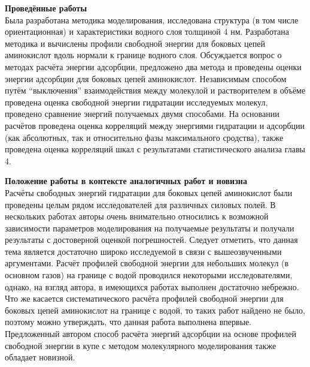 \textbf{Проведённые работы}\\
Была разработана методика моделирования, исследована структура (в том числе ориентационная) и характеристики водного слоя толщиной 4 нм. Разработана методика и вычислены профили свободной энергии для боковых цепей аминокислот вдоль нормали к границе водного слоя. Обсуждается вопрос о методах расчёта энергии адсорбции, предложено два метода и проведены оценки энергии адсорбции для боковых цепей аминокислот. Независимым способом путём ``выключения'' взаимодействия между молекулой и растворителем в объёме проведена оценка свободной энергии гидратации исследуемых молекул, проведено сравнение энергий получаемых двумя способами. На основании расчётов проведена оценка корреляций между энергиями гидратации и адсорбции (как абсолютных, так и относительно фазы максимального сродства), также проведена оценка корреляций шкал с результатами статистического анализа главы 4. 

\textbf{Положение работы в контексте аналогичных работ и новизна}\\
Расчёты свободных энергий гидратации для боковых цепей аминокислот были проведены целым рядом исследователей для различных силовых полей. В нескольких работах авторы очень внимательно относились к возможной зависимости параметров моделирования на получаемые результаты и получали результаты с достоверной оценкой погрешностей. Следует отметить, что данная тема является достаточно широко исследуемой в связи с вышеозвученными аргументами. Расчёт профилей свободной энергии для небольших молекул (в основном газов) на границе с водой проводился некоторыми исследователями, однако, на взгляд автора, в имеющихся работах выполнен достаточно небрежно. Что же касается систематического расчёта профилей свободной энергии для боковых цепей аминокислот на границе с водой, то таких работ найдено не было, поэтому можно утверждать, что данная работа выполнена впервые. Предложенный автором способ расчёта энергий адсорбции на основе профилей свободной энергии в купе с методом молекулярного моделирования также обладает новизной.




